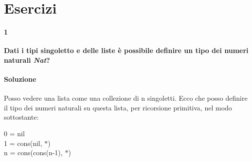 \section{Esercizi}
\label{sec: es-liste}
\paragraph{1}
\textbf{Dati i tipi singoletto e delle liste \`e possibile definire un tipo dei numeri naturali \textit{Nat}?}
\\\\
\textbf{Soluzione}\\\\
Posso vedere una lista come una collezione di n singoletti. Ecco che posso definire il tipo dei numeri naturali su questa lista, per ricorsione primitiva, nel modo sottostante:
\begin{center}
0 = nil \\
1 = cons(nil, $\ast$) \\
n = cons(cons(n-1), $\ast$)
\end{center}

